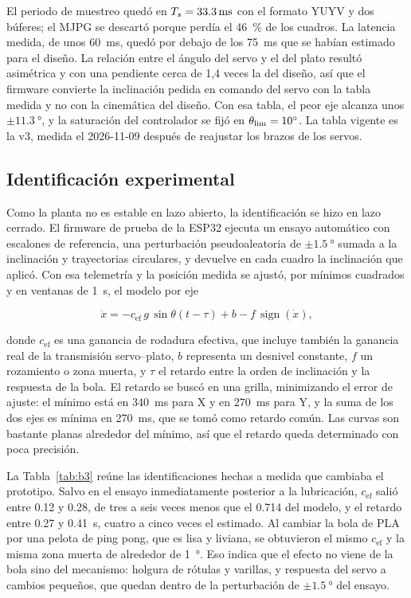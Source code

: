 El periodo de muestreo quedó en $T_s = \SI{33.3}{\milli\second}$ con el formato YUYV y dos
búferes; el MJPG se descartó porque perdía el \SI{46}{\percent} de los cuadros. La latencia
medida, de unos \SI{60}{\milli\second}, quedó por debajo de los \SI{75}{\milli\second} que se
habían estimado para el diseño. La relación entre el ángulo del servo y el del plato resultó
asimétrica y con una pendiente cerca de 1,4 veces la del diseño, así que el firmware convierte
la inclinación pedida en comando del servo con la tabla medida y no con la cinemática del diseño.
Con esa tabla, el peor eje alcanza unos $\pm\SI{11.3}{\degree}$, y la saturación del controlador
se fijó en $\theta_{\mathrm{lim}} = \SI{10}{\degree}$. La tabla vigente es la v3, medida el 2026-11-09 después
de reajustar los brazos de los servos.

\subsection{Identificación experimental}

Como la planta no es estable en lazo abierto, la identificación se hizo en lazo cerrado. El
firmware de prueba de la ESP32 ejecuta un ensayo automático con escalones de referencia, una
perturbación pseudoaleatoria de $\pm\SI{1.5}{\degree}$ sumada a la inclinación y trayectorias
circulares, y devuelve en cada cuadro la inclinación que aplicó. Con esa telemetría y la posición
medida se ajustó, por mínimos cuadrados y en ventanas de \SI{1}{\second}, el modelo por eje

\begin{equation}
\ddot x = -c_{\mathrm{ef}}\,g\,\sin\theta(t-\tau) + b - f\,\operatorname{sign}(\dot x),
\label{eq:b3}
\end{equation}

donde $c_{\mathrm{ef}}$ es una ganancia de rodadura efectiva, que incluye también la ganancia
real de la transmisión servo--plato, $b$ representa un desnivel constante, $f$ un rozamiento o
zona muerta, y $\tau$ el retardo entre la orden de inclinación y la respuesta de la bola. El
retardo se buscó en una grilla, minimizando el error de ajuste: el
mínimo está en \SI{340}{\milli\second} para X y en \SI{270}{\milli\second} para Y, y la suma de
los dos ejes es mínima en \SI{270}{\milli\second}, que se tomó como retardo común. Las curvas son
bastante planas alrededor del mínimo, así que el retardo queda determinado con poca precisión.



La Tabla~\ref{tab:b3} reúne las identificaciones hechas a medida que cambiaba el prototipo.
Salvo en el ensayo inmediatamente posterior a la lubricación, $c_{\mathrm{ef}}$ salió entre
\num{0.12} y \num{0.28}, de tres a seis veces menos que el
\num{0.714} del modelo, y el retardo entre \SI{0.27}{} y \SI{0.41}{\second}, cuatro a cinco
veces el estimado. Al cambiar la bola de PLA por una pelota de ping pong, que es lisa y liviana,
se obtuvieron el mismo $c_{\mathrm{ef}}$ y la misma zona muerta de alrededor de \SI{1}{\degree}.
Eso indica que el efecto no viene de la bola sino del mecanismo: holgura de rótulas y varillas, y
respuesta del servo a cambios pequeños, que quedan dentro de la perturbación de
$\pm\SI{1.5}{\degree}$ del ensayo.

